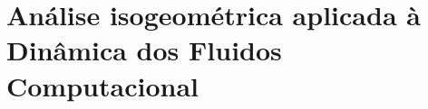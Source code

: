 \documentclass[tese_patricia]{subfiles}
\begin{document}
\chapter[Análise isogeométrica aplicada à Dinâmica dos Fluidos Computacional]{Análise isogeométrica aplicada à Dinâmica dos Fluidos Computacional} \label{capitulo:Cap3}

\end{document}
